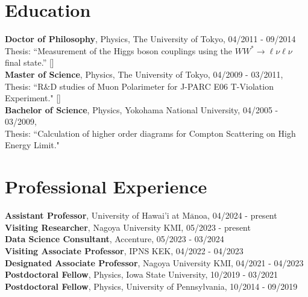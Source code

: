 \documentclass[11pt]{article}
\begin{document}
\section*{\large{Education}} 
{\footnotesize
\textbf{Doctor of Philosophy}, Physics, The University of Tokyo, 04/2011 - 09/2014 \\
Thesis: ``Measurement of the Higgs boson couplings using the $WW^{\ast}\rightarrow \ell\nu\ell\nu$ final state.'' 
[]\\ 
\textbf{Master of Science}, Physics, The University of Tokyo, 04/2009 - 03/2011,\\
Thesis: ``R$\&$D studies of Muon Polarimeter for J-PARC E06 T-Violation Experiment." 
[]\\
 \textbf{Bachelor of Science}, Physics, Yokohama National University, 04/2005 - 03/2009,\\
Thesis: ``Calculation of higher order diagrams for Compton Scattering on High Energy Limit." \\
}

\vspace{-0.2in}
\section*{\large{Professional Experience}}
{\footnotesize
\textbf{Assistant Professor}, University of Hawai'i at M$\bar{\text{a}}$noa, 04/2024 - present \\
\textbf{Visiting Researcher}, Nagoya University KMI, 05/2023 - present \\
\textbf{Data Science Consultant}, Accenture, 05/2023 - 03/2024 \\
\textbf{Visiting Associate Professor}, IPNS KEK, 04/2022 - 04/2023 \\
\textbf{Designated Associate Professor}, Nagoya University KMI, 04/2021 - 04/2023 \\
\textbf{Postdoctoral Fellow}, Physics, Iowa State University, 10/2019 - 03/2021 \\
\textbf{Postdoctoral Fellow}, Physics, University of Pennsylvania, 10/2014 - 09/2019 
}
\end{document}
